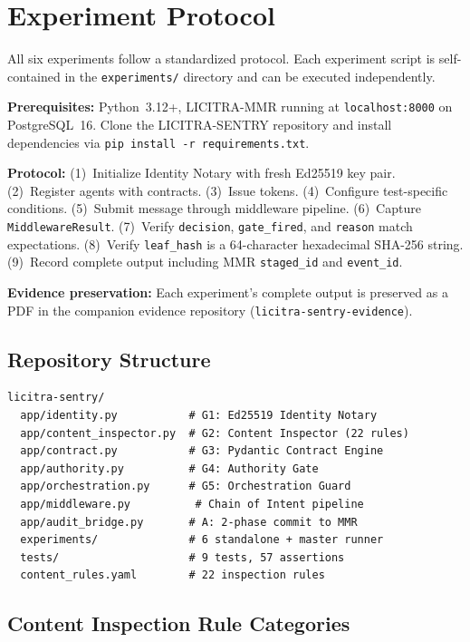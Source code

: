 \documentclass[11pt,a4paper]{article}
\begin{document}
\section{Experiment Protocol}\label{app:protocol}

All six experiments follow a standardized protocol. Each experiment script is self-contained in
the \texttt{experiments/} directory and can be executed independently.

\textbf{Prerequisites:} Python~3.12+, LICITRA-MMR running at \texttt{localhost:8000} on
PostgreSQL~16. Clone the LICITRA-SENTRY repository and install dependencies via
\texttt{pip install -r requirements.txt}.

\textbf{Protocol:} (1)~Initialize Identity Notary with fresh Ed25519 key pair. (2)~Register
agents with contracts. (3)~Issue tokens. (4)~Configure test-specific conditions. (5)~Submit
message through middleware pipeline. (6)~Capture \texttt{MiddlewareResult}. (7)~Verify
\texttt{decision}, \texttt{gate\_fired}, and \texttt{reason} match expectations. (8)~Verify
\texttt{leaf\_hash} is a 64-character hexadecimal SHA-256 string. (9)~Record complete output
including MMR \texttt{staged\_id} and \texttt{event\_id}.

\textbf{Evidence preservation:} Each experiment's complete output is preserved as a PDF in the
companion evidence repository (\texttt{licitra-sentry-evidence}).

\subsection{Repository Structure}

\begin{verbatim}
licitra-sentry/
  app/identity.py           # G1: Ed25519 Identity Notary
  app/content_inspector.py  # G2: Content Inspector (22 rules)
  app/contract.py           # G3: Pydantic Contract Engine
  app/authority.py          # G4: Authority Gate
  app/orchestration.py      # G5: Orchestration Guard
  app/middleware.py          # Chain of Intent pipeline
  app/audit_bridge.py       # A: 2-phase commit to MMR
  experiments/              # 6 standalone + master runner
  tests/                    # 9 tests, 57 assertions
  content_rules.yaml        # 22 inspection rules
\end{verbatim}

\subsection{Content Inspection Rule Categories}
\end{document}
